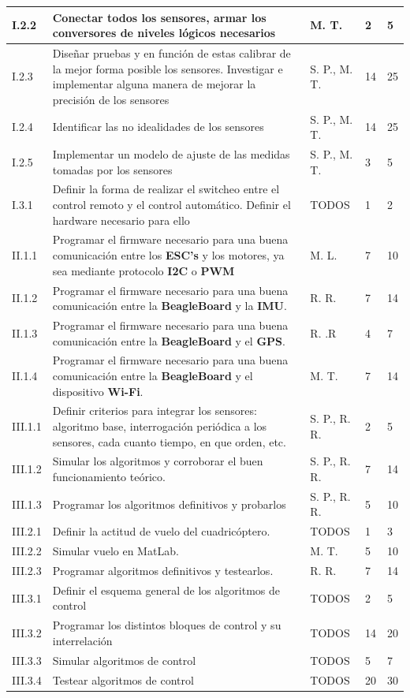 \documentclass[spanish,12pt,a4paper,titlepage]{report}
\begin{document}
\begin{table}[H]
\begin{tabular}{|p{50pt}|p{220pt}|p{60pt}|p{20pt}|p{20pt}|} 
\hline
I.2.2  & Conectar todos los sensores, armar los conversores de niveles lógicos necesarios & M. T. & 2 & 5 \\ \hline

I.2.3  & Diseñar pruebas y en función de estas calibrar de la mejor forma posible los sensores. Investigar e implementar alguna manera de mejorar la precisión de los sensores  & S. P., M. T. & 14 & 25 \\ \hline
I.2.4 & Identificar las no idealidades de los sensores & S. P., M. T. & 14 & 25 \\ \hline
I.2.5 & Implementar un modelo de ajuste de las medidas tomadas por los sensores & S. P., M. T. & 3 & 5 \\ \hline
I.3.1 & Definir la forma de realizar el switcheo entre el control remoto y el control automático. Definir el hardware necesario para ello & TODOS  & 1 & 2\\ \hline \hline
II.1.1  & Programar el firmware necesario para una buena comunicación entre los \textbf{ESC's} y los motores, ya sea mediante protocolo \textbf{I2C} o \textbf{PWM} & M. L. & 7 & 10 \\ \hline
II.1.2  & Programar el firmware necesario para una buena comunicación entre la \textbf{BeagleBoard} y la \textbf{IMU}. & R. R. & 7 & 14 \\ \hline
II.1.3  & Programar el firmware necesario para una buena comunicación entre la \textbf{BeagleBoard} y el \textbf{GPS}. & R. .R  & 4 & 7\\ \hline 
II.1.4  & Programar el firmware necesario para una buena comunicación entre la \textbf{BeagleBoard} y el dispositivo \textbf{Wi-Fi}. & M. T. & 7 & 14 \\ \hline \hline
III.1.1  & Definir criterios para integrar los sensores: algoritmo base, interrogación periódica a los sensores, cada cuanto tiempo, en que orden, etc. & S. P., R. R. & 2 & 5 \\ \hline
III.1.2  & Simular los algoritmos y corroborar el buen funcionamiento teórico. & S. P., R. R.  & 7 & 14\\ \hline
III.1.3  & Programar los algoritmos definitivos y probarlos & S. P., R. R.  & 5 & 10\\ \hline 
III.2.1  & Definir la actitud de vuelo del cuadricóptero. & TODOS  & 1 & 3\\ \hline
III.2.2  & Simular vuelo en MatLab. & M. T. & 5 & 10 \\ \hline
III.2.3  & Programar algoritmos definitivos y testearlos. & R. R. & 7 & 14 \\ \hline
III.3.1  & Definir el esquema general de los algoritmos de control & TODOS & 2 & 5 \\ \hline
III.3.2  & Programar los distintos bloques de control y su interrelación & TODOS & 14 & 20 \\ \hline
III.3.3  & Simular algoritmos de control & TODOS  & 5 & 7\\ \hline
III.3.4  & Testear algoritmos de control & TODOS  & 20 & 30\\ \hline
\end{tabular}
\end{table}
\end{document}
